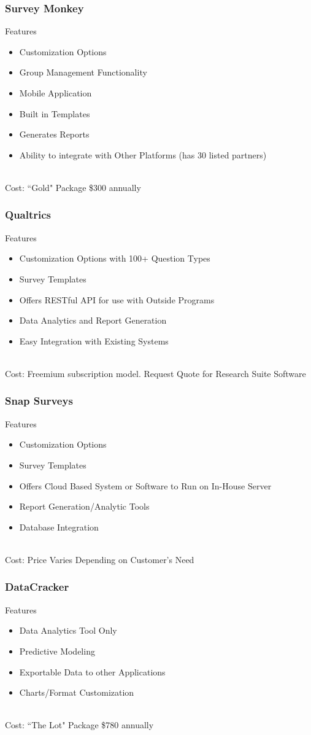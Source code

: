 \documentclass{beamer}
\begin{document}
	\begin{frame}
		\frametitle{Survey Monkey}
		Features
		\begin{itemize}
			\item Customization Options
			\item Group Management Functionality
			\item Mobile Application
			\item Built in Templates
			\item Generates Reports
			\item Ability to integrate with Other Platforms (has 30 listed partners)
		\end{itemize}
		~\\
		Cost: ``Gold" Package \$300 annually
	\end{frame}
	
	\begin{frame}
		\frametitle{Qualtrics}
		Features
		\begin{itemize}
			\item Customization Options with 100+ Question Types
			\item Survey Templates
			\item Offers RESTful API for use with Outside Programs
			\item Data Analytics and Report Generation
			\item Easy Integration with Existing Systems
		\end{itemize}
		~\\
		Cost: Freemium subscription model. Request Quote for Research Suite Software
	\end{frame}
	
	\begin{frame}
		\frametitle{Snap Surveys}
		Features
		\begin{itemize}
			\item Customization Options
			\item Survey Templates
			\item Offers Cloud Based System or Software to Run on In-House Server
			\item Report Generation/Analytic Tools
			\item Database Integration
		\end{itemize}
		~\\
		Cost: Price Varies Depending on Customer's Need
	\end{frame}	
	
	\begin{frame}
		\frametitle{DataCracker}
		Features
		\begin{itemize}
			\item Data Analytics Tool Only
			\item Predictive Modeling
			\item Exportable Data to other Applications
			\item Charts/Format Customization
		\end{itemize}
		~\\
		Cost: ``The Lot" Package \$780 annually
	\end{frame}
	
\end{document}
